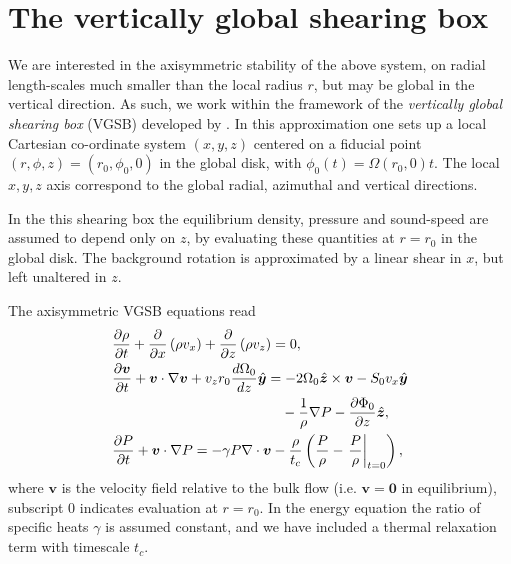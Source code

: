 \section{The vertically global shearing box} 
We are interested in the axisymmetric stability of the above system,
on radial length-scales much smaller than the local radius $r$, but
may be global in the vertical direction. As such, we work within the
framework of the \emph{vertically global shearing 
  box} (VGSB) developed by \cite{mcnally14}. In this approximation
one sets up a local Cartesian co-ordinate  system $(x,y,z)$ centered
on a fiducial point $(r,\phi,z)=(r_0,\phi_0,0)$ in the global disk, with $\phi_0(t) =
\Omega(r_0,0)t$. The local $x,y,z$ axis correspond to the
global radial, azimuthal and vertical directions.  

In the this shearing box the equilibrium density, pressure and
sound-speed are assumed to depend only on $z$, by evaluating these
quantities at $r=r_0$ in the global disk. The background rotation is
approximated by a linear shear in $x$, but left unaltered in $z$.     

The axisymmetric VGSB equations read 
\begin{align}
  & \frac{\p\rho}{\p t} + \frac{\p}{\p x}\left(\rho v_x\right) +
  \frac{\p}{\p z}\left(\rho v_z\right)=0,\\
  & \frac{\p\bm{v}}{\p t} + \bm{v}\cdot\nabla\bm{v} +
  v_zr_0\frac{d\Omega_0}{dz} \hat{\bm{y}} = - 
  2\Omega_0\hat{\bm{z}}\times\bm{v} - S_0v_x\hat{\bm{y}} \notag\\ 
  &\phantom{\frac{\p\bm{v}}{\p t} + \bm{v}\cdot\nabla\bm{v} +
    v_zr_0\frac{d\Omega_0}{dz} \hat{\bm{y}}=}-\frac{1}{\rho}\nabla P - \frac{\p\Phi_0}{\p z}\hat{\bm{z}},\\
  & \frac{\p P}{\p t} + \bm{v}\cdot\nabla P = -\gamma P
  \nabla\cdot\bm{v} -
  \frac{\rho}{t_c}\left(\frac{P}{\rho}-\left.\frac{P}{\rho}\right|_{t=0}\right), 
\end{align}
where $\bm{v}$ is the velocity field relative to the bulk flow
(i.e. $\bm{v}=\bm{0}$ in equilibrium),  
subscript $0$ indicates evaluation at $r=r_0$. In the energy equation
the ratio of specific heats $\gamma$ is assumed constant, 
and we have included a thermal relaxation term with timescale $t_c$.  

